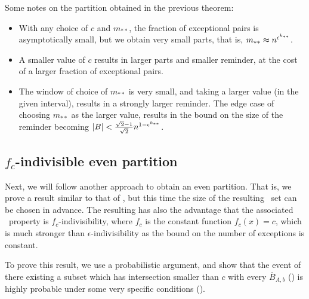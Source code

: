         \begin{remark}
            Some notes on the partition obtained in the previous theorem:
            \begin{itemize}
                \item With any choice of $c$ and $m_{**}$, the fraction of exceptional pairs is asymptotically small,
                    but we obtain very small parts, that is, $m_{**} \thickapprox n^{\epsilon^{k_{**}}}$.
                \item A smaller value of $c$ results in larger parts and smaller reminder, at the cost of a larger fraction
                    of exceptional pairs.
                \item The window of choice of $m_{**}$ is very small, and taking a larger value
                    (in the given interval), results in a strongly larger reminder.
                    The edge case of choosing $m_{**}$ as the larger value, results in the bound on the size of the
                    reminder becoming $| B | < \frac{\sqrt{2}-1}{\sqrt{2}} n^{1-\epsilon^{k_{**}}}$.
            \end{itemize}
        \end{remark}

    \subsection{$f_c$-indivisible even partition} \label{subsec:subsection_4.3}

        Next, we will follow another approach to obtain an even partition.
        That is, we prove a result similar to that of , but this time the size of the resulting
        \regular~set can be chosen in advance.
        The resulting  has also the advantage that
        the associated \regular~property is $f_c$-indivisibility, where $f_c$ is the constant function $f_c(x) = c$, which
        is much stronger than $\epsilon$-indivisibility as the bound on the number of exceptions is constant.

        To prove this result, we use a probabilistic argument, and show that the event of there existing a subset which has
        intersection smaller than $c$ with every $\overline{B}_{A,b}$ () is highly
        probable under some very specific conditions ().

